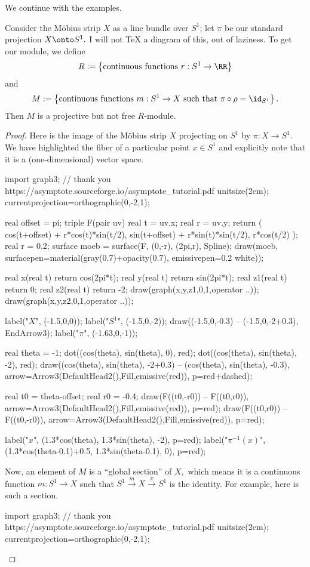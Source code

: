 \documentclass[../notes.tex]{subfiles}
\begin{document}
We continue with the examples.
\begin{exercise}
	Consider the M\"obius strip $X$ as a line bundle over $S^1$; let $\pi$ be our standard projection $X\onto S^1.$ I will not TeX a diagram of this, out of laziness. To get our module, we define
	\[R:=\left\{\text{continuous functions }r:S^1\to\RR\right\}\]
	and
	\[M:=\left\{\text{continuous functions }m:S^1\to X\text{ such that }\pi\circ\rho=\id_{S^1}\right\}.\]
	Then $M$ is a projective but not free $R$-module.
\end{exercise}
\begin{proof}
	Here is the image of the M\"obius strip $X$ projecting on $S^1$ by $\pi:X\to S^1.$ We have highlighted the fiber of a particular point $x\in S^1$ and explicitly note that it is a (one-dimensional) vector space.
	\begin{center}
		\begin{asy}
			import graph3;
			// thank you https://asymptote.sourceforge.io/asymptote_tutorial.pdf
			unitsize(2cm);
			currentprojection=orthographic(0,-2,1);
			
			real offset = pi;
			triple F(pair uv) {
				real t = uv.x;
				real r = uv.y;
				return (
					cos(t+offset) + r*cos(t)*sin(t/2),
					sin(t+offset) + r*sin(t)*sin(t/2),
					r*cos(t/2)
				);
			}
			real r = 0.2;
			surface moeb = surface(F, (0,-r), (2pi,r), Spline);
			draw(moeb, surfacepen=material(gray(0.7)+opacity(0.7), emissivepen=0.2 white));
			
			real x(real t) {return cos(2pi*t);}
			real y(real t) {return sin(2pi*t);}
			real z1(real t) {return 0;}
			real z2(real t) {return -2;}
			draw(graph(x,y,z1,0,1,operator ..));
			draw(graph(x,y,z2,0,1,operator ..));
		
			label("$X$", (-1.5,0,0));
			label("$S^1$", (-1.5,0,-2));
			draw((-1.5,0,-0.3) -- (-1.5,0,-2+0.3), EndArrow3);
			label("$\pi$", (-1.63,0,-1));
			
			real theta = -1;
			dot((cos(theta), sin(theta), 0), red);
			dot((cos(theta), sin(theta), -2), red);
			draw((cos(theta), sin(theta), -2+0.3) -- (cos(theta), sin(theta), -0.3), arrow=Arrow3(DefaultHead2(),Fill,emissive(red)), p=red+dashed);
			
			real t0 = theta-offset;
			real r0 = -0.4;
			draw(F((t0,-r0)) -- F((t0,r0)), arrow=Arrow3(DefaultHead2(),Fill,emissive(red)), p=red);
			draw(F((t0,r0)) -- F((t0,-r0)), arrow=Arrow3(DefaultHead2(),Fill,emissive(red)), p=red);
			
			label("$x$", (1.3*cos(theta), 1.3*sin(theta), -2), p=red);
			label("$\pi^{-1}(x)$", (1.3*cos(theta-0.1)+0.5, 1.3*sin(theta-0.1), 0), p=red);
		\end{asy}
	\end{center}
	Now, an element of $M$ is a ``global section'' of $X,$ which means it is a continuous function $m:S^1\to X$ such that $S^1\stackrel m\to X\stackrel\pi\to S^1$ is the identity. For example, here is such a section.
	\begin{center}
		\begin{asy}
			import graph3;
			// thank you https://asymptote.sourceforge.io/asymptote_tutorial.pdf
			unitsize(2cm);
			currentprojection=orthographic(0,-2,1);
			

\end{asy}
\end{center}
\end{proof}
\end{document}
